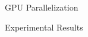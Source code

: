 \documentclass[final,t]{beamer}
\makeatletter
\DeclareRobustCommand\onedot{\futurelet\@let@token\@onedot}
\def\@onedot{\ifx\@let@token.\else.\null\fi\xspace}
\def\eg{{e.g}\onedot} \def\Eg{{E.g}\onedot}
\makeatother
\begin{document}
\begin{frame}{}
\begin{columns}[t]
\begin{column}{.3\linewidth}
\begin{block}{GPU Parallelization}
         \end{block}     
      \begin{block}{Experimental Results}
        \centering


\end{block}
\end{column}
\end{columns}
\end{frame}
\end{document}
